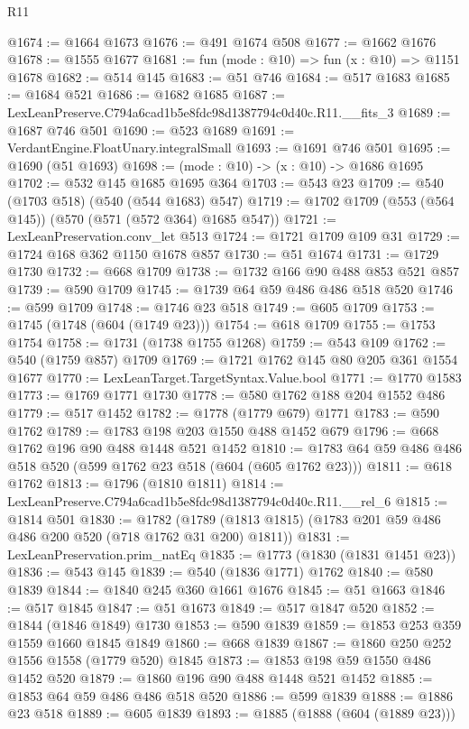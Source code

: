 \begin{lexlean}{R11}
\begin{coremodule}
@1674 := @1664 @1673
@1676 := @491 @1674 @508
@1677 := @1662 @1676
@1678 := @1555 @1677
@1681 := fun (mode : @10) => fun (x : @10) => @1151 @1678
@1682 := @514 @145
@1683 := @51 @746
@1684 := @517 @1683
@1685 := @1684 @521
@1686 := @1682 @1685
@1687 := LexLeanPreserve.C794a6cad1b5e8fdc98d1387794c0d40c.R11.__fits_3
@1689 := @1687 @746 @501
@1690 := @523 @1689
@1691 := VerdantEngine.FloatUnary.integralSmall
@1693 := @1691 @746 @501
@1695 := @1690 (@51 @1693)
@1698 := (mode : @10) -> (x : @10) -> @1686 @1695
@1702 := @532 @145 @1685 @1695 @364
@1703 := @543 @23
@1709 := @540 (@1703 @518) (@540 (@544 @1683) @547)
@1719 := @1702 @1709 (@553 (@564 @145)) (@570 (@571 (@572 @364) @1685 @547))
@1721 := LexLeanPreservation.conv_let @513
@1724 := @1721 @1709 @109 @31
@1729 := @1724 @168 @362 @1150 @1678 @857
@1730 := @51 @1674
@1731 := @1729 @1730
@1732 := @668 @1709
@1738 := @1732 @166 @90 @488 @853 @521 @857
@1739 := @590 @1709
@1745 := @1739 @64 @59 @486 @486 @518 @520
@1746 := @599 @1709
@1748 := @1746 @23 @518
@1749 := @605 @1709
@1753 := @1745 (@1748 (@604 (@1749 @23)))
@1754 := @618 @1709
@1755 := @1753 @1754
@1758 := @1731 (@1738 @1755 @1268)
@1759 := @543 @109
@1762 := @540 (@1759 @857) @1709
@1769 := @1721 @1762 @145 @80 @205 @361 @1554 @1677
@1770 := LexLeanTarget.TargetSyntax.Value.bool
@1771 := @1770 @1583
@1773 := @1769 @1771 @1730
@1778 := @580 @1762 @188 @204 @1552 @486
@1779 := @517 @1452
@1782 := @1778 (@1779 @679) @1771
@1783 := @590 @1762
@1789 := @1783 @198 @203 @1550 @488 @1452 @679
@1796 := @668 @1762 @196 @90 @488 @1448 @521 @1452
@1810 := @1783 @64 @59 @486 @486 @518 @520 (@599 @1762 @23 @518 (@604 (@605 @1762 @23)))
@1811 := @618 @1762
@1813 := @1796 (@1810 @1811)
@1814 := LexLeanPreserve.C794a6cad1b5e8fdc98d1387794c0d40c.R11.__rel_6
@1815 := @1814 @501
@1830 := @1782
    (@1789 (@1813 @1815) (@1783 @201 @59 @486 @486 @200 @520 (@718 @1762 @31 @200) @1811))
@1831 := LexLeanPreservation.prim_natEq
@1835 := @1773 (@1830 (@1831 @1451 @23))
@1836 := @543 @145
@1839 := @540 (@1836 @1771) @1762
@1840 := @580 @1839
@1844 := @1840 @245 @360 @1661 @1676
@1845 := @51 @1663
@1846 := @517 @1845
@1847 := @51 @1673
@1849 := @517 @1847 @520
@1852 := @1844 (@1846 @1849) @1730
@1853 := @590 @1839
@1859 := @1853 @253 @359 @1559 @1660 @1845 @1849
@1860 := @668 @1839
@1867 := @1860 @250 @252 @1556 @1558 (@1779 @520) @1845
@1873 := @1853 @198 @59 @1550 @486 @1452 @520
@1879 := @1860 @196 @90 @488 @1448 @521 @1452
@1885 := @1853 @64 @59 @486 @486 @518 @520
@1886 := @599 @1839
@1888 := @1886 @23 @518
@1889 := @605 @1839
@1893 := @1885 (@1888 (@604 (@1889 @23)))

\end{coremodule}
\end{lexlean}
